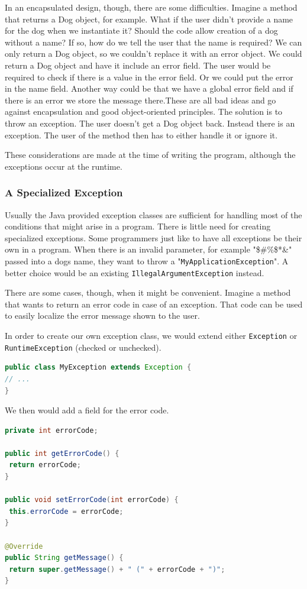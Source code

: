 In an encapsulated design, though, there are some difficulties. Imagine a method that returns a Dog object, for example. What if the user didn't provide a name for the dog when we instantiate it? Should the code allow creation of a dog without a name? If so, how do we tell the user that the name is required? We can only return a Dog object, so we couldn't replace it with an error object. We could return a Dog object and have it include an error field. The user would be required to check if there is a value in the error field. Or we could put the error in the name field. Another way could be that we have a global error field and if there is an error we store the message there.These are all bad ideas and go against encapsulation and good object-oriented principles. The solution is to throw an exception. The user doesn't get a Dog object back. Instead there is an exception. The user of the method then has to either handle it or ignore it.

These considerations are made at the time of writing the program, although the exceptions occur at the runtime.

\subsubsection{A Specialized Exception}
Usually the Java provided exception classes are sufficient for handling most of the conditions that might arise in a program. There is little need for creating specialized exceptions. Some programmers just like to have all exceptions be their own in a program. When there is an invalid parameter, for example "\@\$\#\%\$*\&" passed into a dogs name, they want to  throw a "\texttt{MyApplicationException}". A better choice would be an existing  \texttt{IllegalArgumentException} instead.

There are some cases, though, when it might be convenient. Imagine a method that wants to return an error code in case of an exception. That code can be used to easily localize the error message shown to the user. 

In order to create our own exception class, we would extend either \texttt{Exception} or \texttt{RuntimeException} (checked or unchecked).
\begin{lstlisting}[language=Java]
public class MyException extends Exception {
// ...
}
\end{lstlisting}

We then would add a field for the error code. 
\begin{lstlisting}[language=Java]
private int errorCode;

public int getErrorCode() {
 return errorCode;
}

public void setErrorCode(int errorCode) {
 this.errorCode = errorCode;
}

@Override
public String getMessage() {
 return super.getMessage() + " (" + errorCode + ")";
}
\end{lstlisting}

